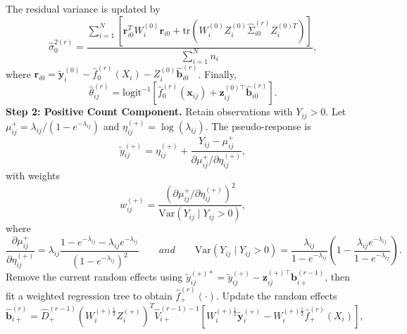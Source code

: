 \documentclass[twoside]{article}
\begin{document}
\begin{alg}
	The residual variance is updated by
	\begin{equation*}
		\hat\sigma_0^{2(r)}
		=
		\frac
		{
			\sum_{i=1}^{N}
			\left[
			\mathbf r_{i0}^{T}
			W_i^{(0)}
			\mathbf r_{i0}
			+
			\mathrm{tr}
			\!\left(
			W_i^{(0)}
			Z_i^{(0)}
			\hat\Sigma_{i0}^{(r)}
			Z_i^{(0)T}
			\right)
			\right]
		}
		{\sum_{i=1}^{N}n_i},
	\end{equation*}
	where
	$
	\mathbf r_{i0}
	=
	\tilde{\mathbf y}_i^{(0)}
	-
	\hat f_0^{(r)}(X_i)
	-
	Z_i^{(0)}
	\hat{\mathbf b}_{i0}^{(r)}
	$.
	Finally,
	\begin{equation*}
		\hat\theta_{ij}^{(r)}
		=
		\mathrm{logit}^{-1}
		\left[
		\hat f_0^{(r)}(\mathbf x_{ij})
		+
		\mathbf z_{ij}^{(0)\top}
		\hat{\mathbf b}_{i0}^{(r)}
		\right].
	\end{equation*}
	\textbf{Step 2: Positive Count Component.}
	Retain observations with $Y_{ij}>0$.
	Let
	$
	\mu_{ij}^{+}
	=
	\lambda_{ij}/(1-e^{-\lambda_{ij}})
	$
	and
	$
	\eta_{ij}^{(+)}
	=
	\log(\lambda_{ij})
	$.
	The pseudo-response is
	\begin{equation*}
		\tilde y_{ij}^{(+)}
		=
		\eta_{ij}^{(+)}
		+
		\frac
		{Y_{ij}-\mu_{ij}^{+}}
		{\partial\mu_{ij}^{+}/\partial\eta_{ij}^{(+)}} ,
	\end{equation*}
	with weights
	\begin{equation*}
		w_{ij}^{(+)}
		=
		\frac
		{\left(\partial\mu_{ij}^{+}/\partial\eta_{ij}^{(+)}\right)^2}
		{\mathrm{Var}(Y_{ij}\mid Y_{ij}>0)},
	\end{equation*}
	where
	\begin{equation*}
		\frac{\partial \mu_{ij}^{+}}
		{\partial \eta_{ij}^{(+)}}
		=
		\lambda_{ij}
		\frac{
			1-e^{-\lambda_{ij}}
			-\lambda_{ij}e^{-\lambda_{ij}}
		}
		{
			\left(1-e^{-\lambda_{ij}}\right)^2
		}  \qquad and \qquad \mathrm{Var}(Y_{ij}\mid Y_{ij}>0)
		=
		\frac{\lambda_{ij}}
		{1-e^{-\lambda_{ij}}}
		\left(
		1-
		\frac{\lambda_{ij}e^{-\lambda_{ij}}}
		{1-e^{-\lambda_{ij}}}
		\right).
	\end{equation*}
	Remove the current random effects using
	$
	\tilde y_{ij}^{(+)*}
	=
	\tilde y_{ij}^{(+)}
	-
	\mathbf z_{ij}^{(+)\top}\mathbf b_{i+}^{(r-1)}
	$,
	then fit a weighted regression tree to obtain $\hat f_+^{(r)}(\cdot)$.
	Update the random effects
	\begin{equation*}
		\hat{\mathbf b}_{i+}^{(r)}
		=
		\hat D_+^{(r-1)}
		\left(
		W_i^{(+)\frac12}Z_i^{(+)}
		\right)^T
		\hat V_{i+}^{(r-1)-1}
		\left[
		W_i^{(+)\frac12}\tilde{\mathbf y}_i^{(+)}
		-
		W_i^{(+)\frac12}\hat f_+^{(r)}(X_i)
		\right],

\end{equation*}
\end{alg}
\end{document}
